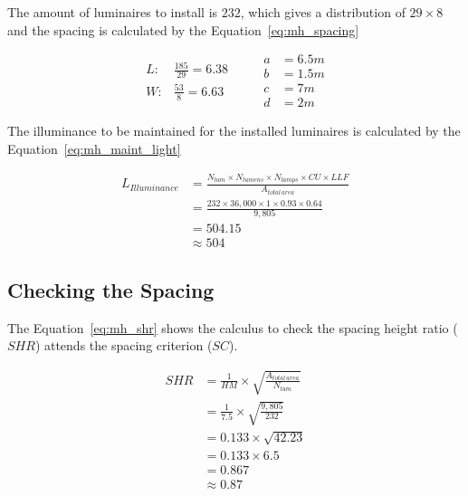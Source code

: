 The amount of luminaires to install is $232$, which gives a distribution of $29 \times 8$ and the spacing is calculated by the Equation~\ref{eq:mh_spacing}

\begin{equation}
\begin{split}
L: & \frac{185}
          {29} = 6.38\\
W: & \frac{53}
          {8} = 6.63
\end{split}
\qquad
\begin{split}
a & = 6.5 m \\
b & = 1.5 m \\
c & = 7 m \\
d & = 2 m
\end{split}
\label{eq:mh_spacing}
\end{equation}

The illuminance to be maintained for the installed luminaires is calculated by the Equation~\ref{eq:mh_maint_light}

\begin{equation}
\begin{split}
L_{Illuminance} & =
\frac {N_{lum} \times N_{lumens} \times N_{lamps} \times CU \times LLF}
      {A_{total\,area}} \\
 & = \frac{232 \times 36,000 \times 1 \times 0.93 \times 0.64}
          {9,805} \\
 & = 504.15 \\
 & \approx 504
\end{split}
\label{eq:mh_maint_light}
\end{equation}

\subsection{Checking the Spacing}
The Equation~\ref{eq:mh_shr} shows the calculus to check the spacing height ratio ($SHR$) attends the spacing criterion ($SC$).

\begin{equation}
\begin{split}
SHR & = \frac {1}{HM} \times \sqrt{\frac{A_{total\,area}}{N_{lum}}} \\
 & = \frac {1}{7.5} \times \sqrt{\frac{9,805}{232}} \\
 & = 0.133 \times \sqrt{42.23} \\
 & = 0.133 \times 6.5 \\
 & = 0.867 \\
 & \approx 0.87
\end{split}
\label{eq:mh_shr}
\end{equation}

